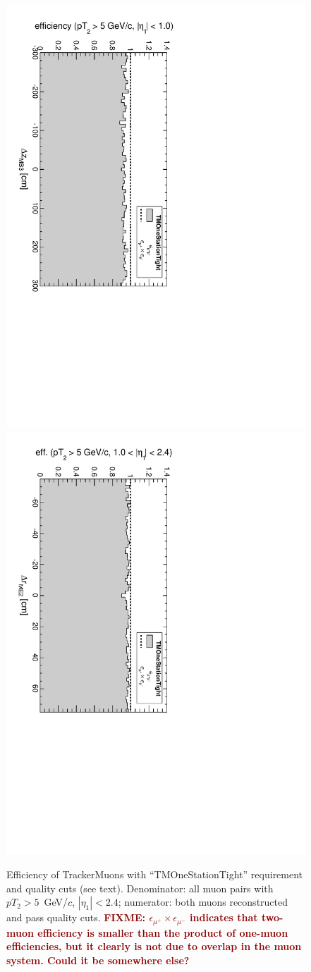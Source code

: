\documentclass[12pt]{article}
\newcommand{\fixme}[1]{\textcolor{darkred}{\bf FIXME: #1}}
\begin{document}
\begin{figure}
\includegraphics[height=0.5\linewidth, angle=90]{fig/acceptance8_plot/vsmb3dz_TMOneStationTight.pdf}
\includegraphics[height=0.5\linewidth, angle=90]{fig/acceptance8_plot/vsme2dr_TMOneStationTight.pdf}

\caption{Efficiency of TrackerMuons with ``TMOneStationTight'' requirement and quality cuts (see text).  Denominator: all muon pairs with $pT_2 > 5$~GeV/$c$, $|\eta_1| < 2.4$; numerator: both muons reconstructed and pass quality cuts. \fixme{$\epsilon_{\mu^+} \times \epsilon_{\mu^-}$ indicates that two-muon efficiency is smaller than the product of one-muon efficiencies, but it clearly is not due to overlap in the muon system.  Could it be somewhere else?} \label{fig:efficiencies_TMOneStationTight}}
\end{figure}
\end{document}
